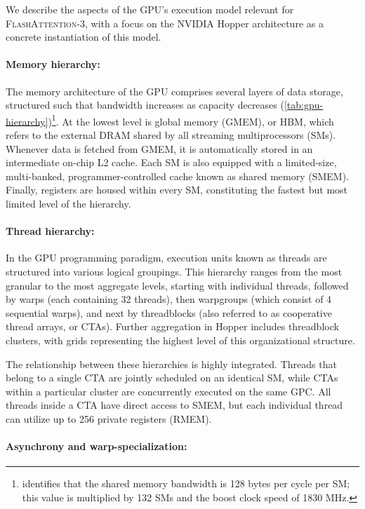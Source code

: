\begin{enumerate}
We describe the aspects of the GPU's execution model relevant for \textsc{FlashAttention-3}, with a focus on the NVIDIA Hopper architecture as a concrete instantiation of this model.

\paragraph{Memory hierarchy:} The memory architecture of the GPU comprises several layers of data storage, structured such that bandwidth increases as capacity decreases (\cref{tab:gpu-hierarchy})\footnote{\citet{luo2024benchmarking} identifies that the shared memory bandwidth is 128 bytes per cycle per SM; this value is multiplied by 132 SMs and the boost clock speed of 1830 MHz.}. At the lowest level is global memory (GMEM), or HBM, which refers to the external DRAM shared by all streaming multiprocessors (SMs). Whenever data is fetched from GMEM, it is automatically stored in an intermediate on-chip L2 cache. Each SM is also equipped with a limited-size, multi-banked, programmer-controlled cache known as shared memory (SMEM). Finally, registers are housed within every SM, constituting the fastest but most limited level of the hierarchy.

\paragraph{Thread hierarchy:} In the GPU programming paradigm, execution units known as threads are structured into various logical groupings. This hierarchy ranges from the most granular to the most aggregate levels, starting with individual threads, followed by warps (each containing 32 threads), then warpgroups (which consist of 4 sequential warps), and next by threadblocks (also referred to as cooperative thread arrays, or CTAs). Further aggregation in Hopper includes threadblock clusters, with grids representing the highest level of this organizational structure.

The relationship between these hierarchies is highly integrated. Threads that belong to a single CTA are jointly scheduled on an identical SM, while CTAs within a particular cluster are concurrently executed on the same GPC. All threads inside a CTA have direct access to SMEM, but each individual thread can utilize up to 256 private registers (RMEM).

\paragraph{Asynchrony and warp-specialization:}


\end{enumerate}
